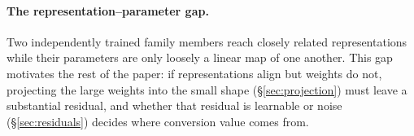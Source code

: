 \paragraph{The representation--parameter gap.}
Two independently trained family members reach closely related
representations while their parameters are only loosely a linear
map of one another. This gap motivates the rest of the paper: if representations align but
weights do not, projecting the large weights into the small shape
(\S\ref{sec:projection}) must leave a substantial residual, and whether that
residual is learnable or noise (\S\ref{sec:residuals}) decides where conversion
value comes from.


